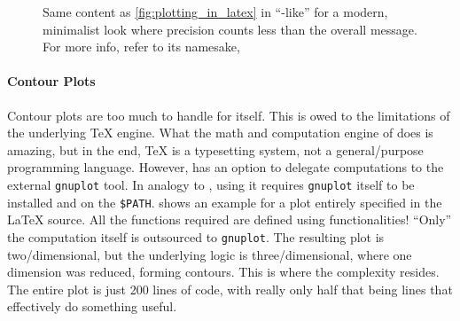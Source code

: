 \begin{figure}[tbp]

    \centering
    \caption[Tufte-like plot]{%
        Same content as \cref{fig:plotting_in_latex} in
        \enquote{\emph{}-like}
        for a modern, minimalist look where precision counts less than
        the overall message.
        For more info, refer to its namesake, %
    }
    \label{fig:plotting_in_latex_tufte}
\end{figure}

\paragraph{Contour Plots}
Contour plots are too much to handle for  itself.
This is owed to the limitations of the underlying \TeX{} engine.
What the math and computation engine of  does is amazing,
but in the end, \TeX{} is a typesetting system, not a general\-/purpose programming
language.
However,  has an option to delegate computations to the
external \texttt{gnuplot} tool.
In analogy to , using it requires \texttt{gnuplot} itself to be
installed and on the \verb|$PATH|.
 shows an example for a plot entirely specified in the
\LaTeX{} source.
All the functions required are defined using  functionalities!
\enquote{Only} the computation itself is outsourced to \texttt{gnuplot}.
The resulting plot is two\-/dimensional, but the underlying logic is
three\-/dimensional, where one dimension was reduced, forming contours.
This is where the complexity resides.
The entire plot is just 200 lines of code, with really only half that being
lines that effectively do something useful.


